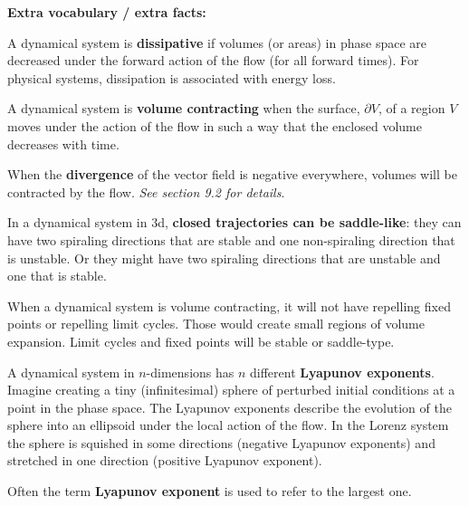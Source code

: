 \documentclass[12pt,letterpaper,noanswers]{exam}
\begin{document}
\noindent \textbf{Extra vocabulary / extra facts:}
\begin{tcolorbox}

A dynamical system is \textbf{dissipative} if volumes (or areas) in phase space are decreased under the forward action of the flow (for all forward times).  For physical systems, dissipation is associated with energy loss.

A dynamical system is \textbf{volume contracting} when the surface, $\partial V$, of a region $V$ moves under the action of the flow in such a way that the enclosed volume decreases with time. %

When the \textbf{divergence} of the vector field is negative everywhere, volumes will be contracted by the flow.  \emph{See section 9.2 for details}.

In a dynamical system in 3d, \textbf{closed trajectories can be saddle-like}: they can have two spiraling directions that are stable and one non-spiraling direction that is unstable.  Or they might have two spiraling directions that are unstable and one that is stable.

When a dynamical system is volume contracting, it will not have repelling fixed points or repelling limit cycles.  Those would create small regions of volume expansion.  Limit cycles and fixed points will be stable or saddle-type.

A dynamical system in $n$-dimensions has $n$ different \textbf{Lyapunov exponents}. Imagine creating a tiny (infinitesimal) sphere of perturbed initial conditions at a point in the phase space.  The Lyapunov exponents describe the evolution of the sphere into an ellipsoid under the local action of the flow.  In the Lorenz system the sphere is squished in some directions (negative Lyapunov exponents) and stretched in one direction (positive Lyapunov exponent).

Often the term \textbf{Lyapunov exponent} is used to refer to the largest one.

\end{tcolorbox}
\end{document}

